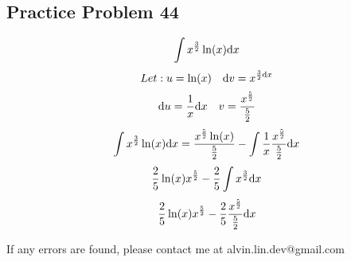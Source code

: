 \documentclass[letterpaper, 12pt]{math}
\begin{document}
\subsection*{Practice Problem 44}
\[ \int{x^{\frac{3}{2}}\ln(x)\mathrm{d}{x}} \]
\[ Let: u = \ln(x) \quad \mathrm{d}{v} = x^{\frac{3}{2}\mathrm{d}{x}} \]
\[ \mathrm{d}{u} = \frac{1}{x}\mathrm{d}{x} \quad v =
   \frac{x^{\frac{5}{2}}}{\frac{5}{2}} \]
\[ \int{x^{\frac{3}{2}}\ln(x)\mathrm{d}{x}}=
   \frac{x^{\frac{5}{2}}\ln(x)}{\frac{5}{2}}-
   \int{\frac{1}{x}\frac{x^{\frac{5}{2}}}{\frac{5}{2}}\mathrm{d}{x}} \]
\[ \frac{2}{5}\ln(x)x^{\frac{5}{2}}-\frac{2}{5}\int{x^{\frac{3}{2}}\mathrm{d}{x}} \]
\[ \frac{2}{5}\ln(x)x^{\frac{5}{2}}-
   \frac{2}{5}\frac{x^{\frac{5}{2}}}{\frac{5}{2}}\mathrm{d}{x} \]

\begin{center}
  If any errors are found, please contact me at alvin.lin.dev@gmail.com
\end{center}
\end{document}
